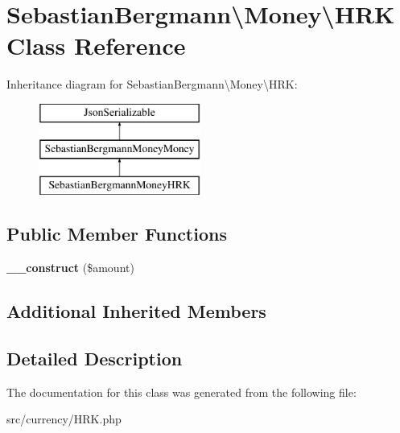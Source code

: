 \hypertarget{classSebastianBergmann_1_1Money_1_1HRK}{}\section{Sebastian\+Bergmann\textbackslash{}Money\textbackslash{}H\+R\+K Class Reference}
\label{classSebastianBergmann_1_1Money_1_1HRK}
Inheritance diagram for Sebastian\+Bergmann\textbackslash{}Money\textbackslash{}H\+R\+K\+:\begin{figure}[H]
\begin{center}
\leavevmode
\includegraphics[height=3.000000cm]{classSebastianBergmann_1_1Money_1_1HRK}
\end{center}
\end{figure}
\subsection*{Public Member Functions}
\begin{DoxyCompactItemize}
\item 
\hypertarget{classSebastianBergmann_1_1Money_1_1HRK_a9865ae1aaeda642fe9bec8c3ebba0400}{}{\bfseries \+\_\+\+\_\+construct} (\$amount)\label{classSebastianBergmann_1_1Money_1_1HRK_a9865ae1aaeda642fe9bec8c3ebba0400}

\end{DoxyCompactItemize}
\subsection*{Additional Inherited Members}


\subsection{Detailed Description}


The documentation for this class was generated from the following file\+:\begin{DoxyCompactItemize}
\item 
src/currency/H\+R\+K.\+php\end{DoxyCompactItemize}
